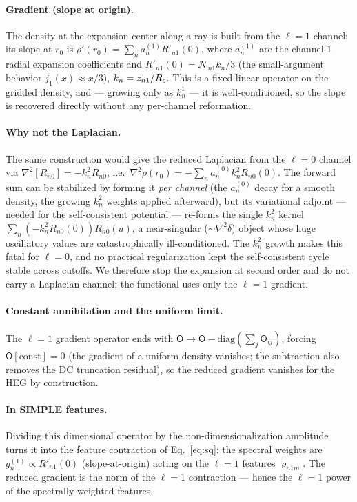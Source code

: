 \paragraph*{Gradient (slope at origin).}
The density at the expansion center along a ray is built from the $\ell=1$
channel; its slope at $r_0$ is $\rho'(r_0)=\sum_n a^{(1)}_n R'_{n1}(0)$, where
$a^{(1)}_n$ are the channel-$1$ radial expansion coefficients and
$R'_{n1}(0)=\mathcal N_{n1}k_n/3$ (the small-argument behavior $j_1(x)\approx x/3$),
$k_n=z_{n1}/R_{c}$. This is a fixed linear operator on the gridded density, and ---
growing only as $k_n^1$ --- it is well-conditioned, so the slope is recovered
directly without any per-channel reformation.

\paragraph*{Why not the Laplacian.}
The same construction would give the reduced Laplacian from the $\ell=0$ channel via
$\nabla^2[R_{n0}]=-k_n^2 R_{n0}$, i.e.\ $\nabla^2\rho(r_0)=-\sum_n a^{(0)}_n k_n^2
R_{n0}(0)$. The forward sum can be stabilized by forming it \emph{per channel} (the
$a^{(0)}_n$ decay for a smooth density, the growing $k_n^2$ weights applied
afterward), but its variational adjoint --- needed for the self-consistent
potential --- re-forms the single $k_n^2$ kernel $\sum_n(-k_n^2 R_{n0}(0))R_{n0}(u)$,
a near-singular ($\sim\nabla^2\delta$) object whose huge oscillatory values are
catastrophically ill-conditioned. The $k_n^2$ growth makes this fatal for $\ell=0$,
and no practical regularization kept the self-consistent cycle stable across cutoffs.
We therefore stop the expansion at second order and do not carry a Laplacian channel;
the functional uses only the $\ell=1$ gradient.

\paragraph*{Constant annihilation and the uniform limit.}
The $\ell=1$ gradient operator ends with
$\mathsf O\to\mathsf O-\mathrm{diag}(\sum_j\mathsf O_{ij})$, forcing
$\mathsf O[\text{const}]=0$ (the gradient of a uniform density vanishes; the
subtraction also removes the DC truncation residual), so the reduced gradient
vanishes for the HEG by construction.

\paragraph*{In SIMPLE features.}
Dividing this dimensional operator by the non-dimensionalization amplitude turns it
into the feature contraction of Eq.~\eqref{eq:sq}: the spectral weights are
$g^{(1)}_n\propto R'_{n1}(0)$ (slope-at-origin) acting on the $\ell=1$ features
$\varrho_{n1m}$. The reduced gradient is the norm of the $\ell=1$ contraction --- hence the
$\ell=1$ power of the spectrally-weighted features.

